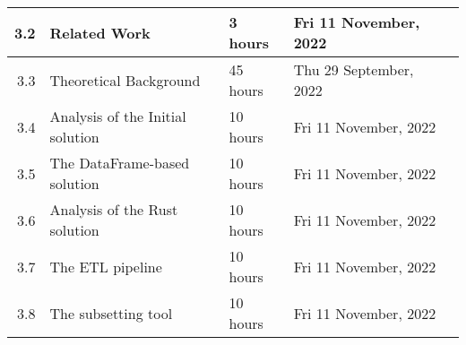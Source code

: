 \documentclass{standalone}
\begin{document}
\begin{tabular}{|r|llll|}
    3.2                                                           & \multicolumn{1}{l|}{Related Work}                               & \multicolumn{1}{l|}{3 hours}                                   & \multicolumn{1}{l|}{Fri 11 November, 2022}                  &                                                              \\ \hline
    3.3                                                           & \multicolumn{1}{l|}{Theoretical Background}                     & \multicolumn{1}{l|}{45 hours}                                  & \multicolumn{1}{l|}{Thu 29 September, 2022}                 &                                                              \\ \hline
    3.4                                                           & \multicolumn{1}{l|}{Analysis of the Initial solution}           & \multicolumn{1}{l|}{10 hours}                                  & \multicolumn{1}{l|}{Fri 11 November, 2022}                  &                                                              \\ \hline
    3.5                                                           & \multicolumn{1}{l|}{The DataFrame-based solution}               & \multicolumn{1}{l|}{10 hours}                                  & \multicolumn{1}{l|}{Fri 11 November, 2022}                  &                                                              \\ \hline
    3.6                                                           & \multicolumn{1}{l|}{Analysis of the Rust solution}              & \multicolumn{1}{l|}{10 hours}                                  & \multicolumn{1}{l|}{Fri 11 November, 2022}                  &                                                              \\ \hline
    3.7                                                           & \multicolumn{1}{l|}{The ETL pipeline}                           & \multicolumn{1}{l|}{10 hours}                                  & \multicolumn{1}{l|}{Fri 11 November, 2022}                  &                                                              \\ \hline
    3.8                                                           & \multicolumn{1}{l|}{The subsetting tool}                        & \multicolumn{1}{l|}{10 hours}                                  & \multicolumn{1}{l|}{Fri 11 November, 2022}                  &                                                              \\ \hline

\end{tabular}
\end{document}
